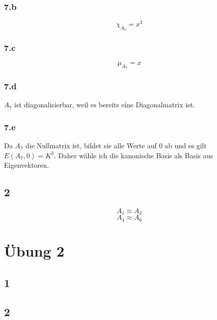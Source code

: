 \documentclass[10pt,a4paper]{article}
\begin{document}
\subsubsection*{7.b}

\begin{equation}
\chi_{A_{7}} = x^{3}
\end{equation}

\subsubsection*{7.c}

\begin{equation}
\mu_{A_{7}} = x
\end{equation}

\subsubsection*{7.d}

$A_{7}$ ist diagonalisierbar, weil es bereits eine Diagonalmatrix ist.

\subsubsection*{7.e}

Da $A_{7}$ die Nullmatrix ist, bildet sie alle Werte auf $0$ ab und es gilt $E(A_{7}, 0) = K^{3}$.
Daher wähle ich die kanonische Basis als Basis aus Eigenvektoren.

\subsection*{2}

\begin{equation}
A_{1} \approx A_{3}
\end{equation}
\begin{equation}
A_{4} \approx A_{6}
\end{equation}

\section*{Übung 2}

\subsection*{1}

\subsection*{2}
\end{document}
